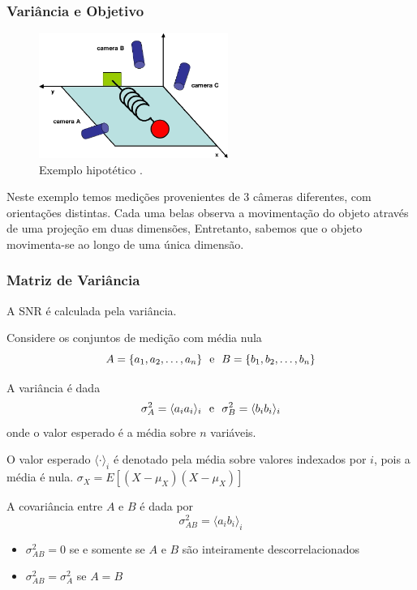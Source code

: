 \begin{frame}%
  \frametitle{Variância e Objetivo}
  \begin{figure}[h!]
  \centering
  \includegraphics[width=0.55\textwidth]{images/toy-ex.png}
  \caption{Exemplo hipotético \citep{shlens2014}.}
  \label{fig:toy-ex}
  \end{figure}
  \vspace{-0.5cm}
  \begin{small}
  Neste exemplo temos medições provenientes de 3 câmeras diferentes, com orientações distintas.
  Cada uma belas observa a movimentação do objeto através de uma projeção em duas dimensões,
  Entretanto, sabemos que o objeto movimenta-se ao longo de uma única dimensão.
  \end{small}
\end{frame} 

\begin{frame}[allowframebreaks]
  \frametitle{Matriz de Variância}
  A SNR é calculada pela variância.

  Considere os conjuntos de medição com média nula
  \begin{equation}
  A = \{ a_1 , a_2 , \ldots , a_n \} \ \textmd{ e } \ B = \{ b_1, b_2 , \ldots , b_n\}
  \end{equation}

  A variância é dada
  \begin{equation}
  \sigma_A^2 = \langle a_i a_i \rangle_i   \ \textmd{ e } \  \sigma_B^2 = \langle b_i b_i \rangle_i
  \end{equation}
  onde o valor esperado é a média sobre $n$ variáveis.

  O valor esperado $\langle \cdot \rangle_i$ é denotado pela média sobre valores indexados por $i$,
  pois a média é nula.
  $\sigma_X = E[(X-\mu_X)(X-\mu_X)]$

  \framebreak 

  A covariância entre $A$ e $B$ é dada por
  \begin{equation}
  \sigma_{AB}^2 = \langle a_i b_i \rangle_i
  \end{equation}

  \begin{itemize}
  \item $\sigma_{AB}^2 = 0$ se e somente se $A$ e $B$ são inteiramente descorrelacionados
  \item $\sigma_{AB}^2 = \sigma_{A}^2$ se $A=B$
  \end{itemize}

\end{frame}


